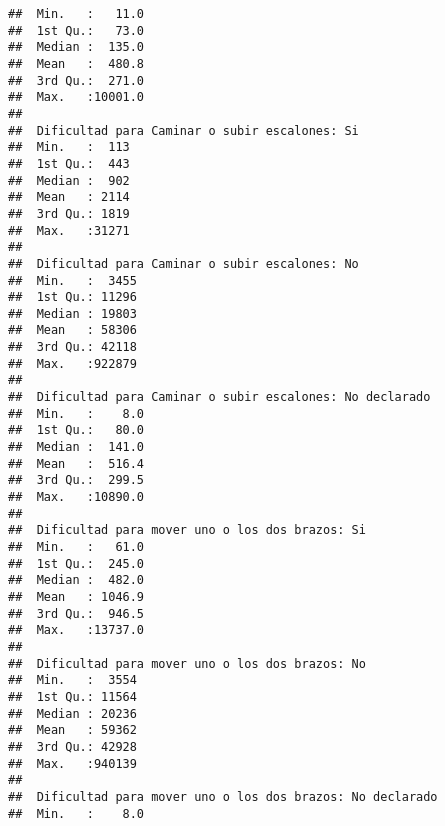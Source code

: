 \documentclass[11pt,]{article}
\begin{document}
\begin{verbatim}
##  Min.   :   11.0                                        
##  1st Qu.:   73.0                                        
##  Median :  135.0                                        
##  Mean   :  480.8                                        
##  3rd Qu.:  271.0                                        
##  Max.   :10001.0                                        
##                                                         
##  Dificultad para Caminar o subir escalones: Si
##  Min.   :  113                                
##  1st Qu.:  443                                
##  Median :  902                                
##  Mean   : 2114                                
##  3rd Qu.: 1819                                
##  Max.   :31271                                
##                                               
##  Dificultad para Caminar o subir escalones: No
##  Min.   :  3455                               
##  1st Qu.: 11296                               
##  Median : 19803                               
##  Mean   : 58306                               
##  3rd Qu.: 42118                               
##  Max.   :922879                               
##                                               
##  Dificultad para Caminar o subir escalones: No declarado
##  Min.   :    8.0                                        
##  1st Qu.:   80.0                                        
##  Median :  141.0                                        
##  Mean   :  516.4                                        
##  3rd Qu.:  299.5                                        
##  Max.   :10890.0                                        
##                                                         
##  Dificultad para mover uno o los dos brazos: Si
##  Min.   :   61.0                               
##  1st Qu.:  245.0                               
##  Median :  482.0                               
##  Mean   : 1046.9                               
##  3rd Qu.:  946.5                               
##  Max.   :13737.0                               
##                                                
##  Dificultad para mover uno o los dos brazos: No
##  Min.   :  3554                                
##  1st Qu.: 11564                                
##  Median : 20236                                
##  Mean   : 59362                                
##  3rd Qu.: 42928                                
##  Max.   :940139                                
##                                                
##  Dificultad para mover uno o los dos brazos: No declarado
##  Min.   :    8.0                                         

\end{verbatim}
\end{document}
